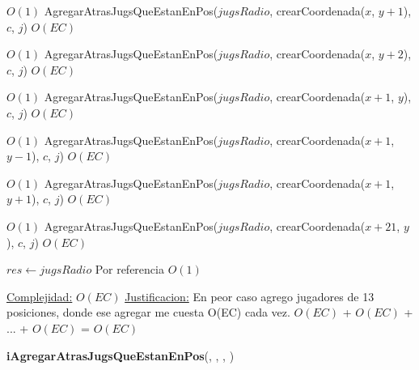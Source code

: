 \begin{Algoritmos}
\begin{algorithmic}[1]
         \Comment $O(1)$
        \State AgregarAtrasJugsQueEstanEnPos($jugsRadio$, crearCoordenada($x$, $y+1$), $c$, $j$)    \Comment $O(EC)$
    \EndIf


             \Comment $O(1)$
            \State AgregarAtrasJugsQueEstanEnPos($jugsRadio$, crearCoordenada($x$, $y+2$), $c$, $j$)    \Comment $O(EC)$
        \EndIf


    \EndIf

\EndIf

         \Comment $O(1)$
        \State AgregarAtrasJugsQueEstanEnPos($jugsRadio$, crearCoordenada($x+1$, $y$), $c$, $j$)    \Comment $O(EC)$
    \EndIf

             \Comment $O(1)$
            \State AgregarAtrasJugsQueEstanEnPos($jugsRadio$, crearCoordenada($x+1$, $y-1$), $c$, $j$)    \Comment $O(EC)$
        \EndIf
    \EndIf

             \Comment $O(1)$
            \State AgregarAtrasJugsQueEstanEnPos($jugsRadio$, crearCoordenada($x+1$, $y+1$), $c$, $j$)    \Comment $O(EC)$
        \EndIf

    \EndIf
\EndIf

         \Comment $O(1)$
        \State AgregarAtrasJugsQueEstanEnPos($jugsRadio$, crearCoordenada($x+21$, $y$), $c$, $j$)    \Comment $O(EC)$
    \EndIf
\EndIf

\State $res \gets jugsRadio$ \Comment Por referencia $O(1)$

\medskip
\State \underline{Complejidad:} $O(EC)$ %
\State \underline{Justificacion:} En peor caso agrego jugadores de 13 posiciones, donde ese agregar me cuesta O(EC) cada vez. $O(EC)$ + $O(EC)$ + ... + $O(EC)$ = $O(EC)$ 

\end{algorithmic}


  



\begin{algorithm}[H]
{\textbf{iAgregarAtrasJugsQueEstanEnPos}(, , , )}
\begin{algorithmic}[1]


\end{algorithmic}
\end{algorithm}
\end{Algoritmos}
